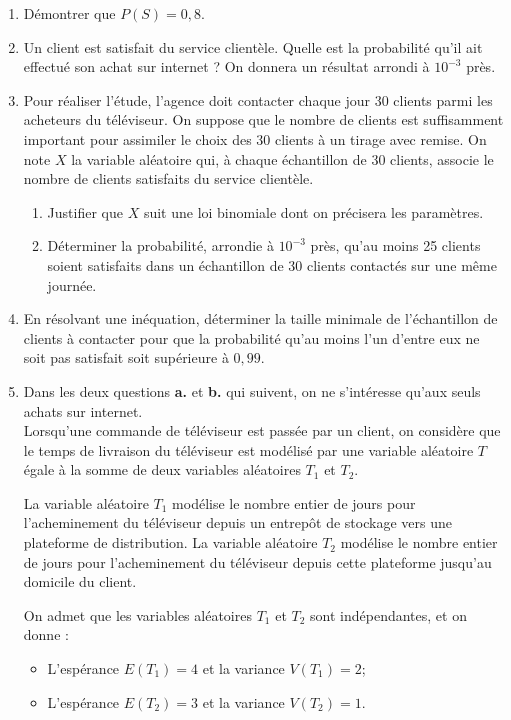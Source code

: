 \begin{enumerate}
	\item Démontrer que $P(S)=0,8$.

	\item Un client est satisfait du service clientèle. Quelle est la probabilité qu'il ait effectué son achat sur internet ? On donnera un résultat arrondi à $10^{-3}$ près.

	\item Pour réaliser l'étude, l'agence doit contacter chaque jour 30 clients parmi les acheteurs du téléviseur. On suppose que le nombre de clients est suffisamment important pour assimiler le choix des 30 clients à un tirage avec remise. On note $X$ la variable aléatoire qui, à chaque échantillon de 30 clients, associe le nombre de clients satisfaits du service clientèle.

	\begin{enumerate}
		\item Justifier que $X$ suit une loi binomiale dont on précisera les paramètres.
		\item Déterminer la probabilité, arrondie à $10^{-3}$ près, qu'au moins 25 clients soient satisfaits dans un échantillon de 30 clients contactés sur une même journée.
	\end{enumerate}

	\item En résolvant une inéquation, déterminer la taille minimale de l'échantillon de clients à contacter pour que la probabilité qu'au moins l'un d'entre eux ne soit pas satisfait soit supérieure à $0,99$.

	\item Dans les deux questions \textbf{a.} et \textbf{b.} qui suivent, on ne s'intéresse qu'aux seuls achats sur internet.\\
	Lorsqu'une commande de téléviseur est passée par un client, on considère que le temps de livraison du téléviseur est modélisé par une variable aléatoire $T$ égale à la somme de deux variables aléatoires $T_{1}$ et $T_{2}$.

	La variable aléatoire $T_{1}$ modélise le nombre entier de jours pour l'acheminement du téléviseur depuis un entrepôt de stockage vers une plateforme de distribution. La variable aléatoire $T_{2}$ modélise le nombre entier de jours pour l'acheminement du téléviseur depuis cette plateforme jusqu'au domicile du client.

	On admet que les variables aléatoires $T_{1}$ et $T_{2}$ sont indépendantes, et on donne :
	\begin{itemize}
		\item L'espérance $E\left(T_{1}\right)=4$ et la variance $V\left(T_{1}\right)=2$;
		\item L'espérance $E\left(T_{2}\right)=3$ et la variance $V\left(T_{2}\right)=1$.
	\end{itemize}


\end{enumerate}

